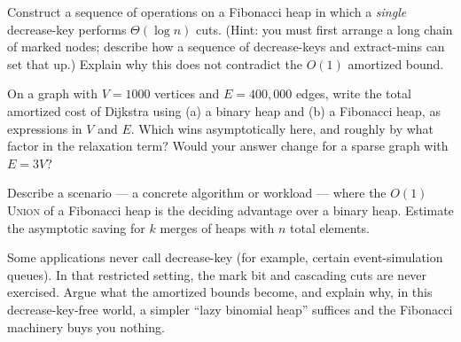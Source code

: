\begin{exercise}
Construct a sequence of operations on a Fibonacci heap in which a \emph{single}
decrease-key performs $\Theta(\log n)$ cuts. (Hint: you must first arrange a
long chain of marked nodes; describe how a sequence of decrease-keys and
extract-mins can set that up.) Explain why this does not contradict the $O(1)$
amortized bound.
\end{exercise}

\begin{exercise}
On a graph with $V = 1000$ vertices and $E = 400{,}000$ edges, write the total
amortized cost of Dijkstra using (a) a binary heap and (b) a Fibonacci heap, as
expressions in $V$ and $E$. Which wins asymptotically here, and roughly by what
factor in the relaxation term? Would your answer change for a sparse graph with
$E = 3V$?
\end{exercise}

\begin{exercise}
Describe a scenario --- a concrete algorithm or workload --- where the $O(1)$
\textsc{Union} of a Fibonacci heap is the deciding advantage over a binary heap.
Estimate the asymptotic saving for $k$ merges of heaps with $n$ total elements.
\end{exercise}

\begin{exercise}
Some applications never call decrease-key (for example, certain event-simulation
queues). In that restricted setting, the mark bit and cascading cuts are never
exercised. Argue what the amortized bounds become, and explain why, in this
decrease-key-free world, a simpler ``lazy binomial heap'' suffices and the
Fibonacci machinery buys you nothing.
\end{exercise}
